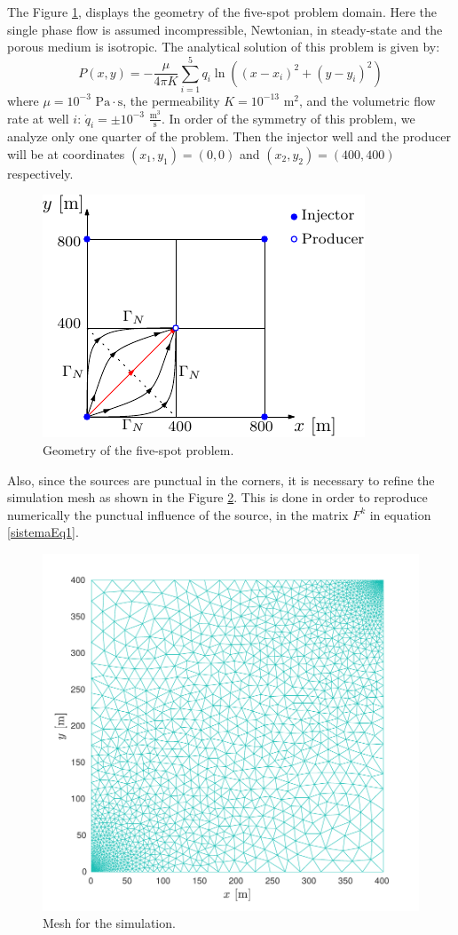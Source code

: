 \documentclass[review]{elsarticle}
\begin{document}
 The Figure \ref{fig:5puntos1ex}, displays the geometry of the five-spot problem domain. Here the single phase flow is assumed incompressible, Newtonian, in steady-state and the porous medium is isotropic.  The analytical solution of this problem is given by:
\begin{equation}
\label{exact_5spot}
P(x,y) = -\frac{\mu}{4 \pi K} \sum_{i=1}^5 q_i\ln\left( (x-x_i)^2+ (y-y_i)^2\right) 
\end{equation}
where $\mu = 10^{-3}$ $\mathrm{Pa}\cdot\mathrm{s}$, the permeability $K = 10^{-13}$ $\mathrm{m^2}$, and the volumetric flow rate at well $i$: $\dot{q}_i= \pm 10^{-3}$  $\frac{\mathrm{m^3}}{\mathrm{s}}$.
In order of the symmetry of this problem, we analyze only one quarter of the problem. Then the injector well and the producer will be at coordinates $(x_1,y_1)= (0,0)$ and $(x_2,y_2)= (400,400)$ respectively.   

\begin{figure}[H]
	\centering
	\includegraphics[width=0.5\linewidth]{./Figures/Examples/FiveSpot/fivepointfig.pdf}
	\caption[Test geometry 1]{Geometry of the five-spot problem.}
	\label{fig:5puntos1ex}
\end{figure}

Also, since the sources are punctual in the corners, it is necessary to refine the simulation mesh as shown in the Figure \ref{fig:5puntosMesh}. This is done in order to reproduce numerically the punctual influence of the source, in the matrix $F^k$ in equation \eqref{sistemaEq1}.
\begin{figure}[H]
	\centering
	\includegraphics[width=0.6\linewidth]{./Figures/Examples/FiveSpot/5spot1_Mesh.pdf}
	\caption[Test geometry 1]{Mesh for the simulation.}
	\label{fig:5puntosMesh}
\end{figure}
\end{document}
